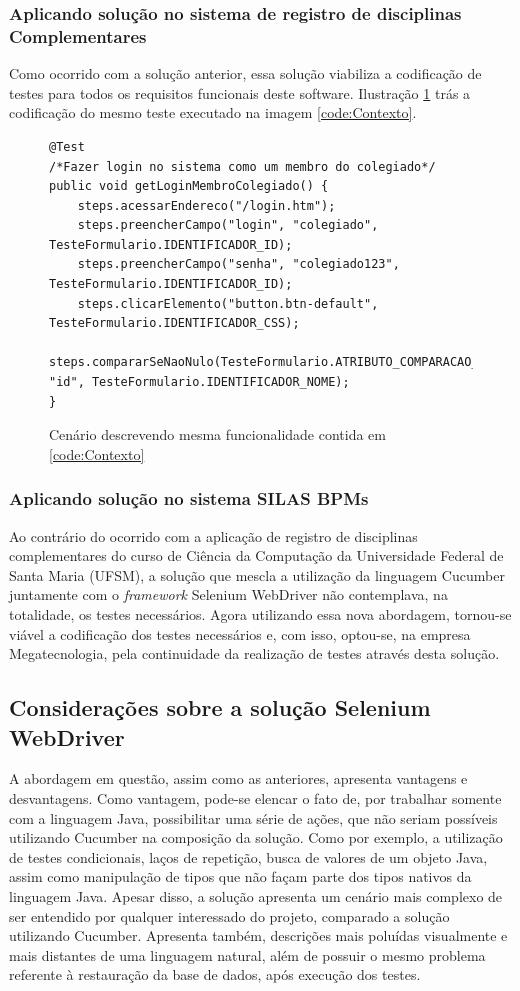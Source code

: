 \documentclass[tg]{mdtufsm}
\begin{document}
\subsubsection{Aplicando solução no sistema de registro de disciplinas Complementares}
Como ocorrido com a solução anterior, essa solução viabiliza a codificação de testes para todos os requisitos funcionais deste software. Ilustração \ref{code:seleniumPiec} trás a codificação do mesmo teste executado na imagem \ref{code:Contexto}.

\begin{figure}[!htt]
	\begin{lstlisting}
@Test
/*Fazer login no sistema como um membro do colegiado*/
public void getLoginMembroColegiado() {
    steps.acessarEndereco("/login.htm");
    steps.preencherCampo("login", "colegiado", TesteFormulario.IDENTIFICADOR_ID);
    steps.preencherCampo("senha", "colegiado123", TesteFormulario.IDENTIFICADOR_ID);
    steps.clicarElemento("button.btn-default", TesteFormulario.IDENTIFICADOR_CSS);
    steps.compararSeNaoNulo(TesteFormulario.ATRIBUTO_COMPARACAO_ASSERT_NOME_TAG, "id", TesteFormulario.IDENTIFICADOR_NOME);
}
	\end{lstlisting}
	\caption{Cenário descrevendo mesma funcionalidade contida em \ref{code:Contexto}}
	\label{code:seleniumPiec}
\end{figure}

\subsubsection{Aplicando solução no sistema SILAS BPMs}
Ao contrário do ocorrido com a aplicação de registro de disciplinas complementares do curso de Ciência da Computação da Universidade Federal de Santa Maria (UFSM), a solução que mescla a utilização da linguagem Cucumber juntamente com o \emph{framework} Selenium WebDriver não contemplava, na totalidade, os testes necessários. Agora utilizando essa nova abordagem, tornou-se viável a codificação dos testes necessários e, com isso, optou-se, na empresa Megatecnologia, pela continuidade da realização de testes através desta solução.

\subsection{Considerações sobre a solução Selenium WebDriver}
A abordagem em questão, assim como as anteriores, apresenta vantagens e desvantagens. Como vantagem, pode-se elencar o fato de, por trabalhar somente com a linguagem Java, possibilitar uma série de ações, que não seriam possíveis utilizando Cucumber na composição da solução. Como por exemplo, a utilização de testes condicionais, laços de repetição, busca de valores de um objeto Java, assim como manipulação de tipos que não façam parte dos tipos nativos da linguagem Java. Apesar disso, a solução apresenta um cenário mais complexo de ser entendido por qualquer interessado do projeto, comparado a solução utilizando Cucumber. Apresenta também, descrições mais poluídas visualmente e mais distantes de uma linguagem natural, além de possuir o mesmo problema referente à restauração da base de dados, após execução dos testes.
\end{document}
